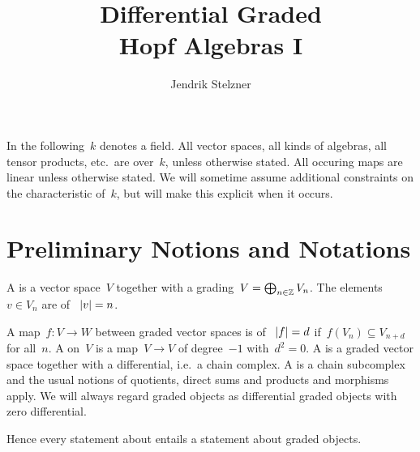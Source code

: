 \documentclass[a4paper,10pt,headings=standardclasses]{scrartcl}
\title{Differential Graded \\ Hopf Algebras I}
\author{Jendrik Stelzner}
\date{}
\begin{document}
\maketitle

In the following~$k$ denotes a field.
All vector spaces, all kinds of algebras, all tensor products, etc.\ are over~$k$, unless otherwise stated.
All occuring maps are linear unless otherwise stated.
We will sometime assume additional constraints on the characteristic of~$k$, but will make this explicit when it occurs.





\section{Preliminary Notions and Notations}

A  is a vector space~$V$ together with a grading~$V = \bigoplus_{n \in \mathbb{Z}} V_n$.
The elements~$v \in V_n$ are  of ~$\lvert v\rvert = n$.
\begin{center}
\end{center}
A map~$f \colon V \to W$ between graded vector spaces is  of ~$\lvert f\rvert = d$ if~$f(V_n) \subseteq V_{n+d}$ for all~$n$.
A  on~$V$ is a map~$V \to V$ of degree~$-1$ with~$d^2 = 0$.
A  is a graded vector space together with a differential, i.e.\ a chain complex.
A {\dgsub} is a chain subcomplex and the usual notions of quotients, direct sums and products and morphisms apply.
We will always regard graded objects as differential graded objects with zero differential.
\begin{center}
\end{center}
Hence every statement about {\dgos} entails a statement about graded objects.
\end{document}
